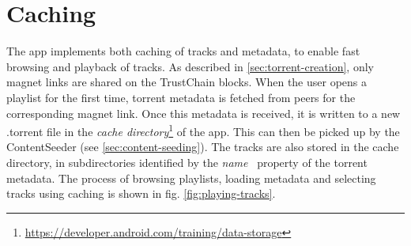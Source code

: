 \section{Caching}
The app implements both caching of tracks and metadata, to enable fast browsing and playback of tracks. As described in \ref{sec:torrent-creation}, only magnet links are shared on the TrustChain blocks. When the user opens a playlist for the first time, torrent metadata is fetched from peers for the corresponding magnet link. Once this metadata is received, it is written to a new .torrent file in the \textit{cache directory}\footnote{\url{https://developer.android.com/training/data-storage}} of the app. This can then be picked up by the ContentSeeder (see \ref{sec:content-seeding}). The tracks are also stored in the cache directory, in subdirectories identified by the \textit{name}~\citep{bittorrentbep3} property of the torrent metadata. The process of browsing playlists, loading metadata and selecting tracks using caching is shown in fig. \ref{fig:playing-tracks}.
